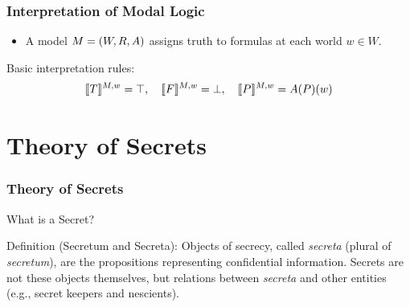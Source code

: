 \documentclass[aspectratio=169]{beamer}
\let\mathcal\relax
\begin{document}
\begin{frame}
\frametitle{Interpretation of Modal Logic}
\Large
\begin{itemize}
    \item A model $\mathcal{M} = (W, R, A)$ assigns truth to formulas at each world $w \in W$.
\end{itemize}
\begin{block}{Basic interpretation rules:}
\[
\llbracket T \rrbracket^{\mathcal{M}, w} = \top, 
\quad 
\llbracket F \rrbracket^{\mathcal{M}, w} = \bot, 
\quad 
\llbracket P \rrbracket^{\mathcal{M}, w} = A(P)(w)
\]
\end{block}
\end{frame}


\section{Theory of Secrets}

\begin{frame}
\frametitle{Theory of Secrets}

\Large What is a Secret?

\vspace{1em}

\begin{block}{Definition (Secretum and Secreta):}  
Objects of secrecy, called \emph{secreta} (plural of \emph{secretum}), are the propositions representing confidential information.  
Secrets are not these objects themselves, but relations between \emph{secreta} and other entities (e.g., secret keepers and nescients).
\end{block}
\end{frame}
\end{document}
